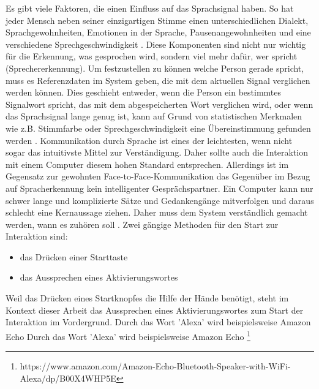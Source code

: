 \newline \newline
Es gibt viele Faktoren, die einen Einfluss auf das Sprachsignal haben. So hat jeder Mensch neben seiner einzigartigen Stimme einen unterschiedlichen Dialekt, Sprachgewohnheiten, Emotionen in der Sprache, Pausenangewohnheiten und eine verschiedene Sprechgeschwindigkeit \cite{KaufmannPfisterSprache}. Diese Komponenten sind nicht nur wichtig für die Erkennung, was gesprochen wird, sondern viel mehr dafür, wer spricht (Sprechererkennung).
\newline \newline
Um festzustellen zu können welche Person gerade spricht, muss es Referenzdaten im System geben, die mit dem aktuellen Signal verglichen werden können. Dies geschieht entweder, wenn die Person ein bestimmtes Signalwort spricht, das mit dem abgespeicherten Wort verglichen wird, oder wenn das Sprachsignal lange genug ist, kann auf Grund von statistischen Merkmalen wie z.B. Stimmfarbe oder Sprechgeschwindigkeit eine Übereinstimmung gefunden werden \cite{KaufmannPfisterSprache}. 
\newline \newline
Kommunikation durch Sprache ist eines der leichtesten, wenn nicht sogar das intuitivste Mittel zur Verständigung. Daher sollte auch die Interaktion mit einem Computer diesem hohen Standard entsprechen. Allerdings ist im Gegensatz zur gewohnten Face-to-Face-Kommunikation das Gegenüber im Bezug auf Spracherkennung kein intelligenter Gesprächspartner. Ein Computer kann nur schwer lange und komplizierte Sätze und Gedankengänge mitverfolgen und daraus schlecht eine Kernaussage ziehen. Daher muss dem System verständlich gemacht werden, wann es zuhören soll \cite{SpeechInteraction}.
Zwei gängige Methoden für den Start zur Interaktion sind:
\begin{itemize}
      \item das Drücken einer Starttaste
      \item das Aussprechen eines Aktivierungswortes
\end{itemize}
\vspace{\baselineskip}
Weil das Drücken eines Startknopfes die Hilfe der Hände benötigt, steht im Kontext dieser Arbeit das Aussprechen eines Aktivierungswortes zum Start der Interaktion im Vordergrund.
Durch das Wort 'Alexa' wird beispielsweise Amazon Echo%
Durch das Wort 'Alexa' wird beispielsweise Amazon Echo%
\footnote{https://www.amazon.com/Amazon-Echo-Bluetooth-Speaker-with-WiFi-Alexa/dp/B00X4WHP5E}
